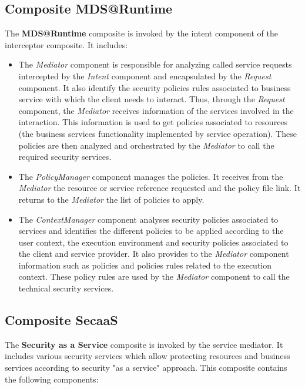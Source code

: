 \documentclass[runningheads,a4paper]{llncs}
\begin{document}
\subsection{Composite MDS@Runtime}
The \textbf{MDS@Runtime}  composite is invoked by the intent component of the interceptor composite. It includes:


\begin{itemize}
\settowidth{\leftmargin}{{\Large$\square$}}\advance\leftmargin{}
\itemsep8pt\relax
\renewcommand\labelitemi{{\lower1.5pt\hbox{\Large$\square$}}}

\item The \emph{Mediator} component is responsible for analyzing called service requests intercepted by the  \emph{Intent} component and  encapsulated by the \emph{Request} component. It also identify the security policies rules associated to business service with which the client needs to interact. Thus, through the \emph{Request} component, the \emph{Mediator} receives information of the services involved in the interaction. This information is used to get policies associated to resources (the business services functionality implemented by service operation). These policies are then analyzed and orchestrated by the \emph{Mediator} to call the required security services.
\item The \emph{PolicyManager} component manages the policies. It receives from the \emph{Mediator} the resource or service reference requested and the policy file link. It returns to the \emph{Mediator} the list of policies to apply.
\item The \emph{ContextManager} component analyses security policies associated to services and identifies the different policies to be applied according to the user context, the execution environment and security policies associated to the client and service provider. It also provides to the \emph{Mediator} component information such as policies and policies rules related to the execution context. These policy rules are used by the \emph{Mediator} component to call the technical security services.
\end{itemize}


\subsection{Composite SecaaS}

The \textbf{Security as a Service} composite is invoked by the service mediator. It includes various security services which allow protecting resources and business services according to security "as a service" approach. This composite contains the following components:
\end{document}
